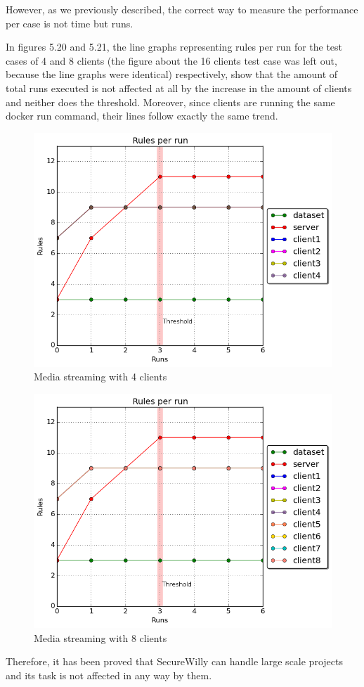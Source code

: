 However, as we previously described, the correct way to measure the performance per case is not time but runs.

In figures 5.20 and 5.21, the line graphs representing rules per run for the test cases of 4 and 8 clients (the figure about the 16 clients test case was left out, because the line graphs were identical) respectively, show that the amount of total runs executed is not affected at all by the increase in the amount of clients and neither does the threshold. Moreover, since clients are running the same docker run command, their lines follow exactly the same trend.

\begin{figure}[h!]
  \centering
   \includegraphics[width=0.65\linewidth]{../figures/scalability/rules_4_t.png}
   \caption{Media streaming with 4 clients}
\end{figure}
\hfill\break\hfill\break
\begin{figure}[h!]
  \centering
   \includegraphics[width=0.68\linewidth]{../figures/scalability/rules_8_t.png}
   \caption{Media streaming with 8 clients}
\end{figure}

Therefore, it has been proved that SecureWilly can handle large scale projects and its task is not affected in any way by them.

